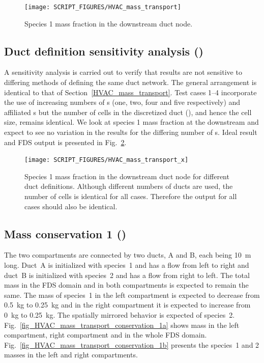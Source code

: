 \documentclass[11pt]{book}
\begin{document}
\begin{figure}[ht]
\centering
\texttt{[image: SCRIPT\_FIGURES/HVAC\_mass\_transport]}
\caption[ test case]{Species \num{1} mass fraction in the downstream duct node.}
\label{fig_HVAC_mass_transport}
\end{figure}

\subsection{Duct definition sensitivity analysis (\texorpdfstring{}{HVAC\_mass\_transport\_\x})}
\label{HVAC_mass_transport_1}
\label{HVAC_mass_transport_2}
\label{HVAC_mass_transport_3}
\label{HVAC_mass_transport_4}
A sensitivity analysis is carried out to verify that results are not sensitive to differing methods of defining the same duct network. The general arrangement is identical to that of Section~\ref{HVAC_mass_transport}. Test cases \numrange{1}{4} incorporate the use of increasing numbers of s (one, two, four and five respectively) and affiliated s but the number of cells in the discretized duct (), and hence the cell size, remains identical. We look at species \num{1} mass fraction at the downstream  and expect to see no variation in the results for the differing number of s. Ideal result and FDS output is presented in Fig.~\ref{fig_HVAC_mass_transport_x}.

\begin{figure}[ht]
\centering
\texttt{[image: SCRIPT\_FIGURES/HVAC\_mass\_transport\_x]}
\caption[ test case]{Species \num{1} mass fraction in the downstream duct node for different duct definitions. Although different numbers of ducts are used, the number of cells is identical for all cases. Therefore the output for all cases should also be identical.}
\label{fig_HVAC_mass_transport_x}
\end{figure}

\subsection{Mass conservation 1 (\texorpdfstring{}{HVAC\_mass\_transport\_conservation\_1})}
\label{HVAC_mass_transport_conservation_1}
The two compartments are connected by two ducts, A and B, each being \SI{10}{\meter} long. Duct~A is initialized with species~1 and has a flow from left to right and duct~B is initialized with species~2 and has a flow from right to left. The total mass in the FDS domain and in both compartments is expected to remain the same. The mass of species~1 in the left compartment is expected to decrease from \SI{0.5}{\kilogram} to \SI{0.25}{\kilogram} and in the right compartment it is expected to increase from \SI{0}{\kilogram} to \SI{0.25}{\kilogram}. The spatially mirrored behavior is expected of species~2. Fig.~\ref{fig_HVAC_mass_transport_conservation_1a} shows mass in the left compartment, right compartment and in the whole FDS domain. Fig.~\ref{fig_HVAC_mass_transport_conservation_1b} presents the species~1 and 2 masses in the left and right compartments.
\end{document}
